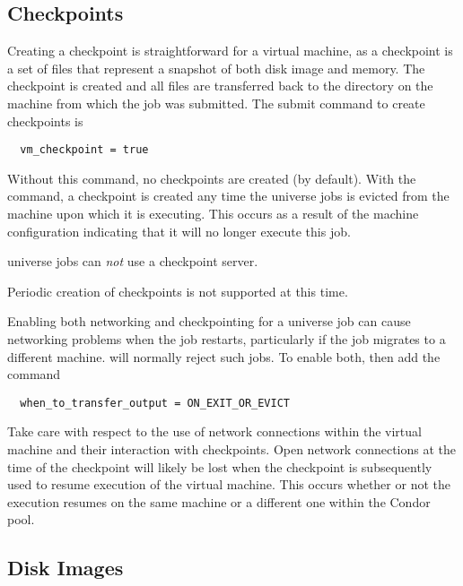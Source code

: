 \subsection{\label{sec:vm-checkpoints}Checkpoints}

Creating a checkpoint is straightforward for a virtual machine,
as a checkpoint is a set of files that represent
a snapshot of both disk image and memory.
The checkpoint is created and all files are transferred back
to the  directory on the machine from which
the job was submitted.
The submit command to create checkpoints is
\begin{verbatim}
  vm_checkpoint = true
\end{verbatim}
Without this command, no checkpoints are created (by default).
With the command, a checkpoint is created any time the 
universe jobs is evicted from the machine upon which it is executing.
This occurs as a result of the machine configuration indicating
that it will no longer execute this job.

 universe jobs can \emph{not} use a checkpoint server.

Periodic creation of checkpoints is not supported at this time.

Enabling both networking and checkpointing for a 
universe job can cause networking problems when the job restarts,
particularly if the job migrates to a different machine.
 will normally reject such jobs.
To enable both, then add the command
\begin{verbatim}
  when_to_transfer_output = ON_EXIT_OR_EVICT
\end{verbatim}

Take care with respect to the use of network connections within
the virtual machine and their interaction with checkpoints.
Open network connections at the time of the checkpoint will likely
be lost when the checkpoint is subsequently used to resume execution
of the virtual machine.
This occurs whether or not the execution resumes
on the same machine or a different one within the Condor pool.   

\subsection{\label{sec:vm-disk-image-details}Disk Images}

